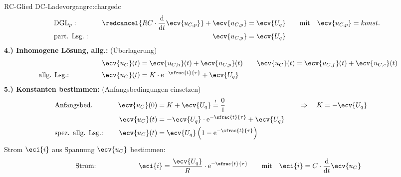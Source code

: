{\begin{bsp}{RC-Glied DC-Ladevorgang}{rc:chargedc}
\begin{align*}
            &\text{DGL}_{p}:&&&
                \redcancel{RC \cdot \frac{\mathrm{d}}{\mathrm{d}t} \ecv{u_{C,p}}} + \ecv{u_{C,p}} &= \ecv{U_q} &&&
                    &\text{mit}\quad \ecv{u_{C,p}} = konst.  \\
            &\text{part. Lsg.}:&&&
                \ecv{u_{C,p}} &= \ecv{U_q}
                \\[-15pt]&\hphantom{R1ooooooo}&&&\hphantom{L3oooooooooooooooooooo}&\hphantom{R3ooo}&&&&\hphantom{R5oooooooooooooooooooooo}\nonumber%
            \end{align*}%
        \textbf{4.) Inhomogene Lösung, allg.:} (Überlagerung)%
        \begin{align*}%
            &&&&
                \ecv{u_C}(t) &= \ecv{u_{C,\mathrm{h}}}(t) + \ecv{u_{C,p}}(t) &&&
                &\ecv{u_C}(t)= \ecv{u_{C,f}}(t) + \ecv{u_{C,e}}(t)  \\
            &\text{allg. Lsg.:}&&&
                \ecv{u_C}(t) &= K \cdot \mathrm{e}^{-\sfrac{t}{\tau}} + \ecv{U_q}
            \\[-15pt]&\hphantom{R1oooooooooooo}&&&\hphantom{L3ooo}&\hphantom{R3oooooooooooooooo}&&&&\hphantom{R5oooooooooooooooooooooo}\nonumber%
        \end{align*}%
        \textbf{5.) Konstanten bestimmen:} (Anfangsbedingungen einsetzen)%
        \begin{align*}%
            &\text{Anfangsbed.}&&&
                \ecv{u_C}(0) &= K + \ecv{U_q} \overset{!}{=} \frac{0}{1} &&&
                &\Rightarrow\quad K = -\ecv{U_q} \\
            &&&&
                \ecv{u_C}(t) &= -\ecv{U_q} \cdot \mathrm{e}^{-\sfrac{t}{\tau}} + \ecv{U_q} \\
            &\text{spez. allg. Lsg.:}&&&
                \ecv{u_C}(t) &= \ecv{U_q} \left( 1 - \mathrm{e}^{-\sfrac{t}{\tau}} \right)
            \\[-15pt]&\hphantom{R1oooooooooooo}&&&\hphantom{L3ooo}&\hphantom{R3oooooooooooooooo}&&&&\hphantom{R5oooooooooooooooooooooo}\nonumber%
            \end{align*}%
        Strom $\eci{i}$ aus Spannung $\ecv{u_C}$ bestimmen:%
        \begin{align*}%
            &\text{Strom:}&&&
                \eci{i} &= \frac{\ecv{U_q}}{R} \cdot \mathrm{e}^{-\sfrac{t}{\tau}} &&&
                &\text{mit}\quad \eci{i} = C \cdot \frac{\mathrm{d}}{\mathrm{d}t} \ecv{u_C}
            \\[-15pt]&\hphantom{R1oooooooooooo}&&&\hphantom{L3ooo}&\hphantom{R3oooooooooooooooo}&&&&\hphantom{R5oooooooooooooooooooooo}\nonumber%
        \end{align*}
        \endgroup
    \end{bsp}
}%

